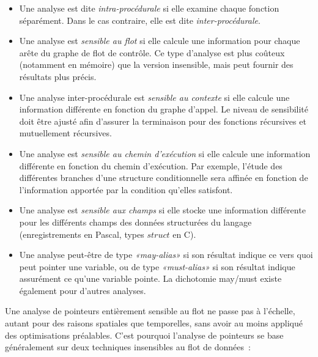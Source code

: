 \documentclass{article}
\begin{document}
\begin{itemize}

\item Une analyse est dite {\it intra-procédurale} si elle examine chaque
fonction séparément. Dans le cas contraire, elle est dite {\it
inter-procédurale}.

\item Une analyse est {\it sensible au flot} si elle calcule une information
pour chaque arête du graphe de flot de contrôle. Ce type d'analyse est plus
coûteux (notamment en mémoire) que la version insensible, mais peut fournir des
résultats plus précis.

\item Une analyse inter-procédurale est {\it sensible au contexte} si elle
calcule une information différente en fonction du graphe d'appel. Le niveau de
sensibilité doit être ajusté afin d'assurer la terminaison pour des fonctions
récursives et mutuellement récursives.

\item Une analyse est {\it sensible au chemin d'exécution} si elle calcule une
information différente en fonction du chemin d'exécution. Par exemple, l'étude
des différentes branches d'une structure conditionnelle sera affinée en
fonction de l'information apportée par la condition qu'elles satisfont.

\item Une analyse est {\it sensible aux champs} si elle stocke une information
différente pour les différents champs des données structurées du langage
(enregistrements en Pascal, types $struct$ en C).

\item Une analyse peut-être de type {\it «may-alias»} si son résultat indique
ce vers quoi peut pointer une variable, ou de type {\it «must-alias»} si son
résultat indique assurément ce qu'une variable pointe. La dichotomie may/must
existe également pour d'autres analyses.

\end{itemize}

Une analyse de pointeurs entièrement sensible au flot ne passe pas à l'échelle,
autant pour des raisons spatiales que temporelles, sans avoir au moins appliqué
des optimisations préalables. C'est pourquoi l'analyse de pointeurs se base
généralement sur deux techniques insensibles au flot de données~:
\end{document}
